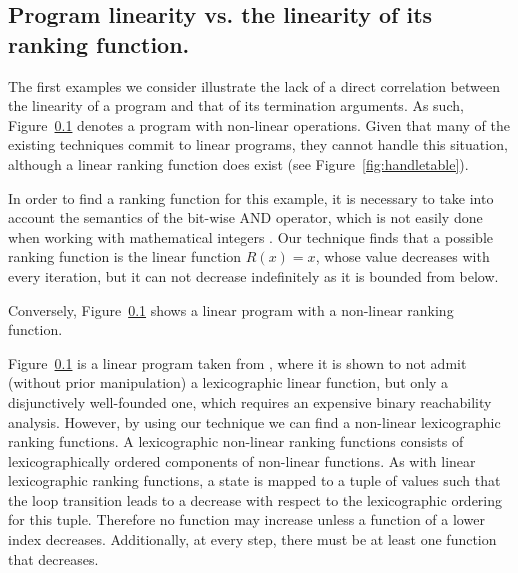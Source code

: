 \documentclass[preprint]{sigplanconf}
\theoremstyle{definition}
\begin{document}

\subsection{Program linearity vs. the linearity of its ranking function.}
The first examples we consider illustrate the lack of a direct correlation between the linearity of a program and that of its termination arguments.
As such, Figure~\ref{} denotes a program with non-linear operations. Given that  many of the existing techniques commit to linear programs, they cannot handle this situation, 
although a linear ranking function does exist (see Figure~\ref{fig:handletable}). 

In order to find a ranking function for this example, it is necessary to take into account
the semantics of the bit-wise AND operator, which is not easily done when working with mathematical integers \cite{}.
Our technique finds that a possible ranking function is the linear function
$R(x) = x$, whose value decreases with
every iteration, but it can not decrease indefinitely as it is bounded from below.

Conversely, Figure~\ref{} shows a linear program with a non-linear ranking function.

Figure~\ref{} is a linear program taken from \cite{DBLP:conf/tacas/CookSZ13}, where it is shown to not admit (without prior manipulation) a lexicographic linear function, but only a disjunctively well-founded one, 
which requires an expensive binary reachability analysis.
However, by using our technique we can find a non-linear lexicographic ranking functions.
A lexicographic non-linear ranking functions consists of lexicographically ordered components
of non-linear functions. As with linear lexicographic ranking functions, a state is mapped to a tuple of values such that the
loop transition leads to a decrease with respect to the lexicographic
ordering for this tuple. Therefore no function may increase unless a function of
a lower index decreases. Additionally, at every step, there must be at least one
function that decreases.
\end{document}
